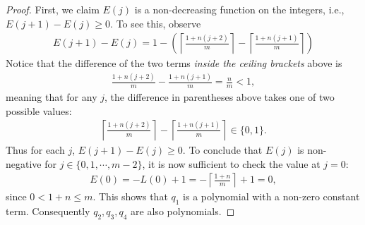 \documentclass[10pt,a4paper]{amsart}
\begin{document}
\begin{proof}
First, we claim $E(j)$ is a non-decreasing function on the integers, i.e., $E(j+1) - E(j) \ge 0$. 
To see this, observe
\begin{align*}
E(j+1) - E(j) = 1 - \left( \left\lceil \frac{1+n(j+2)}{m} \right\rceil - \left\lceil \frac{1+n(j+1)}{m} \right\rceil \right)
\end{align*}
Notice that the difference of the two terms {\em inside the ceiling brackets} above is
\begin{align*}
\frac{1+n(j+2)}{m} - \frac{1+n(j+1)}{m} = \frac{n}{m} < 1,
\end{align*}
meaning that for any $j$, the difference in parentheses above takes one of two possible values:
\begin{align*}
\left\lceil \frac{1+n(j+2)}{m} \right\rceil - \left\lceil \frac{1+n(j+1)}{m} \right\rceil \in \{0,1\}.
\end{align*}
Thus for each $j$, $E(j+1) - E(j) \ge 0$.
To conclude that $E(j)$ is non-negative for $j \in  \{0,1,\cdots,m-2\}$, it is now sufficient to check the value at $j=0$:
\begin{align}
E(0) = -L(0) + 1 = -\left\lceil \frac{1+n}{m} \right\rceil + 1 = 0,
\end{align}
since $0 < 1+n \le m$.
This shows that $q_1$ is a polynomial with a non-zero constant term.
Consequently $q_2,q_3,q_4$ are also polynomials.


\end{proof}
\end{document}
